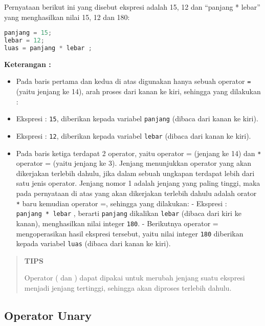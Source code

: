 Pernyataan berikut ini yang disebut ekspresi adalah 15, 12 dan ``panjang
* lebar'' yang menghasilkan nilai 15, 12 dan 180:

\begin{lstlisting}[language=c++, numbers=none]
panjang = 15;
lebar = 12;
luas = panjang * lebar ;
\end{lstlisting}

\textbf{Keterangan :}

\begin{itemize}

\item
  Pada baris pertama dan kedua di atas digunakan hanya sebuah operator
  \texttt{=} (yaitu jenjang ke 14), arah proses dari kanan ke kiri,
  sehingga yang dilakukan :
\item
  Ekspresi : \texttt{15}, diberikan kepada variabel \texttt{panjang}
  (dibaca dari kanan ke kiri).
\item
  Ekspresi : \texttt{12}, diberikan kepada variabel \texttt{lebar}
  (dibaca dari kanan ke kiri).
\item
  Pada baris ketiga terdapat 2 operator, yaitu operator =  (jenjang
  ke 14) dan \texttt{*} operator = (yaitu jenjang ke 3).
  Jenjang menunjukkan operator yang akan dikerjakan terlebih dahulu,
  jika dalam sebuah ungkapan terdapat lebih dari satu jenis operator.
  Jenjang nomor 1 adalah jenjang yang paling tinggi, maka pada
  pernyataan di atas yang akan dikerjakan terlebih dahulu adalah orator
  \texttt{*} baru kemudian operator =, sehingga yang dilakukan:
  - Ekspresi : \texttt{panjang\ *\ lebar} , berarti \texttt{panjang}
  dikalikan \texttt{lebar} (dibaca dari kiri ke kanan), menghasilkan
  nilai integer \texttt{180}. - Berikutnya operator = mengoperasikan
  hasil ekspresi tersebut, yaitu nilai integer \texttt{180} diberikan
  kepada variabel \texttt{luas} (dibaca dari kanan ke kiri).
\end{itemize}

\begin{quotation}
{\LARGE {}} \textbf{TIPS}

Operator
( dan ) dapat dipakai untuk merubah jenjang suatu ekspresi
menjadi jenjang tertinggi, sehingga akan diproses terlebih dahulu.
\end{quotation}


\subsection{ Operator Unary}\label{a-operator-unary}

